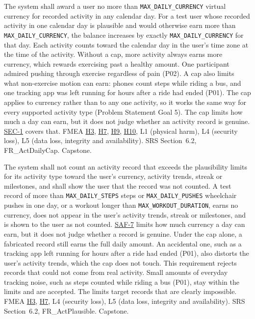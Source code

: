 \documentclass{article}
\newcommand{\reqref}[1]{\hyperref[req:#1]{#1}}
\newcommand{\hazref}[1]{\hyperref[#1]{#1}}
\begin{document}
\begin{description}

{The system shall award a user no more than \texttt{MAX\_DAILY\_CURRENCY}
virtual currency for recorded activity in any calendar day.}
{For a test user whose recorded activity in one calendar day is plausible and
would otherwise earn more than \texttt{MAX\_DAILY\_CURRENCY}, the balance increases by exactly
\texttt{MAX\_DAILY\_CURRENCY} for that day. Each activity counts toward the
calendar day in the user's time zone at the time of the activity.}
{Without a cap, more activity always earns more currency, which rewards
exercising past a healthy amount. One participant admired pushing through
exercise regardless of pain (P02). A cap also limits what non-exercise motion
can earn: phones count steps while riding a bus, and one tracking app was left
running for hours after a ride had ended (P01). The cap applies to currency
rather than to any one activity, so it works the same way for every supported
activity type (Problem Statement Goal 5). The cap limits how much a day can
earn, but it does not judge whether an activity record is genuine.
\reqref{SEC-1} covers that.}
{FMEA \hazref{H3}, \hazref{H7}, \hazref{H9}, \hazref{H10}, L1 (physical harm), L4 (security loss), L5 (data loss, integrity
and availability).}
{SRS Section~6.2, FR\_ActDailyCap.}
{Capstone.}

{The system shall not count an activity record that exceeds the plausibility
limits for its activity type toward the user's currency, activity trends,
streak or milestones, and shall show the user that the record was not counted.}
{A test record of more than \texttt{MAX\_DAILY\_STEPS} steps or
\texttt{MAX\_DAILY\_PUSHES} wheelchair pushes in one day, or a
workout longer than \texttt{MAX\_WORKOUT\_DURATION}, earns no currency, does
not appear in the user's activity trends, streak or milestones, and is shown to
the user as not counted.}
{\reqref{SAF-7} limits how much currency a day can earn, but it does not judge
whether a record is genuine. Under the cap alone, a fabricated record still
earns the full daily amount. An accidental one, such as a tracking app left
running for hours after a ride had ended (P01), also distorts the user's
activity trends, which the cap does not touch. This requirement rejects records
that could not come from real activity.
Small amounts of everyday tracking noise, such as steps counted while riding a
bus (P01), stay within the limits and are accepted. The limits target records
that are clearly impossible.}
{FMEA \hazref{H3}, \hazref{H7}, L4 (security loss), L5 (data loss, integrity and availability).}
{SRS Section~6.2, FR\_ActPlausible.}
{Capstone.}



\end{description}
\end{document}

